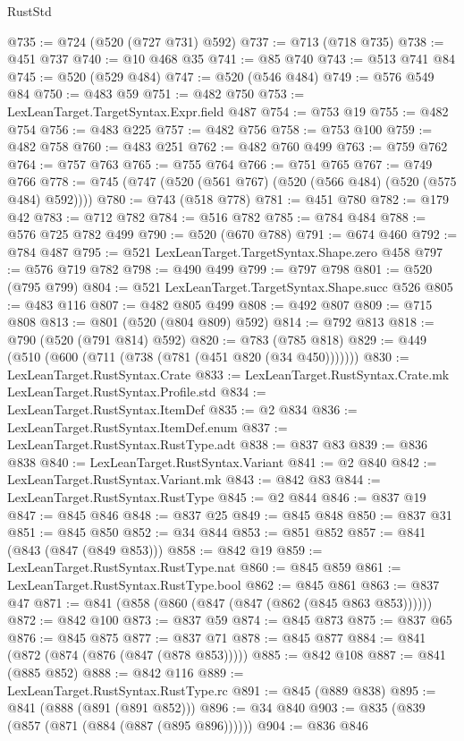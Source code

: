 \begin{lexlean}{RustStd}
\begin{coremodule}
{\begin{coremodule}
{{{{{{{{{{@735 := @724 (@520 (@727 @731) @592)
@737 := @713 (@718 @735)
@738 := @451 @737
@740 := @10 @468 @35
@741 := @85 @740
@743 := @513 @741 @84
@745 := @520 (@529 @484)
@747 := @520 (@546 @484)
@749 := @576 @549 @84
@750 := @483 @59
@751 := @482 @750
@753 := LexLeanTarget.TargetSyntax.Expr.field @487
@754 := @753 @19
@755 := @482 @754
@756 := @483 @225
@757 := @482 @756
@758 := @753 @100
@759 := @482 @758
@760 := @483 @251
@762 := @482 @760 @499
@763 := @759 @762
@764 := @757 @763
@765 := @755 @764
@766 := @751 @765
@767 := @749 @766
@778 := @745 (@747 (@520 (@561 @767) (@520 (@566 @484) (@520 (@575 @484) @592))))
@780 := @743 (@518 @778)
@781 := @451 @780
@782 := @179 @42
@783 := @712 @782
@784 := @516 @782
@785 := @784 @484
@788 := @576 @725 @782 @499
@790 := @520 (@670 @788)
@791 := @674 @460
@792 := @784 @487
@795 := @521 LexLeanTarget.TargetSyntax.Shape.zero @458
@797 := @576 @719 @782
@798 := @490 @499
@799 := @797 @798
@801 := @520 (@795 @799)
@804 := @521 LexLeanTarget.TargetSyntax.Shape.succ @526
@805 := @483 @116
@807 := @482 @805 @499
@808 := @492 @807
@809 := @715 @808
@813 := @801 (@520 (@804 @809) @592)
@814 := @792 @813
@818 := @790 (@520 (@791 @814) @592)
@820 := @783 (@785 @818)
@829 := @449 (@510 (@600 (@711 (@738 (@781 (@451 @820 (@34 @450)))))))
@830 := LexLeanTarget.RustSyntax.Crate
@833 := LexLeanTarget.RustSyntax.Crate.mk LexLeanTarget.RustSyntax.Profile.std
@834 := LexLeanTarget.RustSyntax.ItemDef
@835 := @2 @834
@836 := LexLeanTarget.RustSyntax.ItemDef.enum
@837 := LexLeanTarget.RustSyntax.RustType.adt
@838 := @837 @83
@839 := @836 @838
@840 := LexLeanTarget.RustSyntax.Variant
@841 := @2 @840
@842 := LexLeanTarget.RustSyntax.Variant.mk
@843 := @842 @83
@844 := LexLeanTarget.RustSyntax.RustType
@845 := @2 @844
@846 := @837 @19
@847 := @845 @846
@848 := @837 @25
@849 := @845 @848
@850 := @837 @31
@851 := @845 @850
@852 := @34 @844
@853 := @851 @852
@857 := @841 (@843 (@847 (@849 @853)))
@858 := @842 @19
@859 := LexLeanTarget.RustSyntax.RustType.nat
@860 := @845 @859
@861 := LexLeanTarget.RustSyntax.RustType.bool
@862 := @845 @861
@863 := @837 @47
@871 := @841 (@858 (@860 (@847 (@847 (@862 (@845 @863 @853))))))
@872 := @842 @100
@873 := @837 @59
@874 := @845 @873
@875 := @837 @65
@876 := @845 @875
@877 := @837 @71
@878 := @845 @877
@884 := @841 (@872 (@874 (@876 (@847 (@878 @853)))))
@885 := @842 @108
@887 := @841 (@885 @852)
@888 := @842 @116
@889 := LexLeanTarget.RustSyntax.RustType.rc
@891 := @845 (@889 @838)
@895 := @841 (@888 (@891 (@891 @852)))
@896 := @34 @840
@903 := @835 (@839 (@857 (@871 (@884 (@887 (@895 @896))))))
@904 := @836 @846
}}}}}}}}}}
\end{coremodule}}
\end{coremodule}
\end{lexlean}
